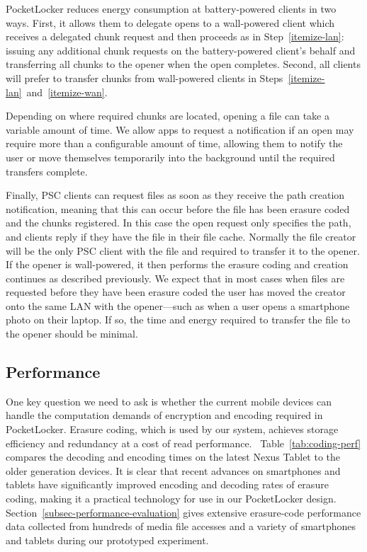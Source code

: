 PocketLocker reduces energy consumption at battery-powered clients in two
ways. First, it allows them to delegate opens to a wall-powered client which
receives a delegated chunk request and then proceeds as in
Step~\ref{itemize-lan}: issuing any additional chunk requests on the
battery-powered client's behalf and transferring all chunks to the opener when
the open completes. Second, all clients will prefer to transfer chunks from
wall-powered clients in Steps~\ref{itemize-lan}~and~\ref{itemize-wan}.

Depending on where required chunks are located, opening a file
can take a variable amount of time.  We allow apps
to request a notification if an open may require more than a configurable
amount of time, allowing them to notify the user or move themselves
temporarily into the background until the required transfers complete.

Finally, PSC clients can request files as soon as they receive the path
creation notification, meaning that this can occur before the file has been
erasure coded and the chunks registered. In this case the open request only
specifies the path, and clients reply if they have the file in their file
cache. Normally the file creator will be the only PSC client with the file
and required to transfer it to the opener. If the opener is wall-powered, it
then performs the erasure coding and creation continues as described
previously. We expect that in most cases when files are requested before they
have been erasure coded the user has moved the creator onto the same LAN with
the opener---such as when a user opens a smartphone photo on their laptop. If
so, the time and energy required to transfer the file to the opener should be
minimal.

\subsection{Performance} One key question we need to ask is whether the current
mobile devices can handle the computation demands of encryption and encoding
required in PocketLocker. Erasure coding, which is used by our system, achieves
storage efficiency and redundancy at a cost of read
performance.~\cite{cook2014compare} Table~\ref{tab:coding-perf} compares the
decoding and encoding times on the latest Nexus Tablet to the older generation
devices.  It is clear that recent advances on smartphones and tablets have
significantly improved encoding and decoding rates of erasure coding, making it
a practical technology for use in our PocketLocker design.
Section~\ref{subsec-performance-evaluation} gives extensive erasure-code
performance data collected from hundreds of media file accesses and a variety
of smartphones and tablets during our prototyped experiment.

